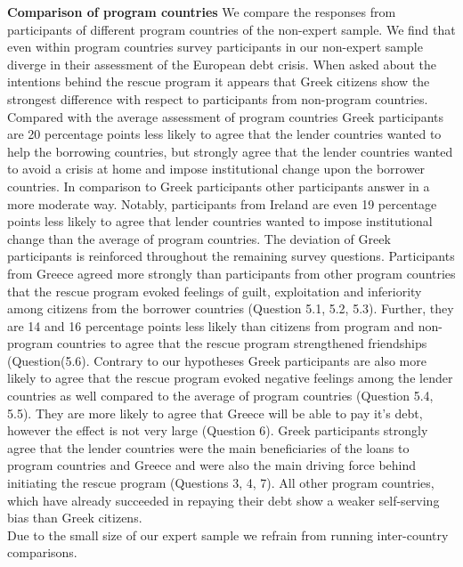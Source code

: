 \textbf{Comparison of program countries} 
We compare the responses from participants of different program countries of the non-expert sample. We find that even within program countries survey participants in our non-expert sample diverge in their assessment of the European debt crisis. When asked about the intentions behind the rescue program it appears that Greek citizens show the strongest difference with respect to participants from non-program countries. Compared with the average assessment of program countries Greek participants are 20 percentage points less likely to agree that the lender countries wanted to help the borrowing countries, but strongly agree that the lender countries wanted to avoid a crisis at home and impose institutional change upon the borrower countries. In comparison to Greek participants other participants answer in a more moderate way. Notably, participants from Ireland are even 19 percentage points less likely to agree that lender countries wanted to impose institutional change than the average of program countries. The deviation of Greek participants is reinforced throughout the remaining survey questions. Participants from Greece agreed more strongly than participants from other program countries that the rescue program evoked feelings of guilt, exploitation and inferiority among citizens from the borrower countries (Question 5.1, 5.2, 5.3). Further, they are 14 and 16 percentage points less likely than citizens from program and non-program countries to agree that the rescue program strengthened friendships (Question(5.6). Contrary to our hypotheses Greek participants are also more likely to agree that the rescue program evoked negative feelings among the lender countries as well compared to the average of program countries (Question 5.4, 5.5).  They are more likely to agree that Greece will be able to pay it's debt, however the effect is not very large (Question 6). Greek participants strongly agree that the lender countries were the main beneficiaries of the loans to program countries and Greece and were also the main driving force behind initiating the rescue program (Questions 3, 4, 7).  All other program countries, which have already succeeded in repaying their debt show a weaker self-serving bias than Greek citizens. 
\\
Due to the small size of our expert sample we refrain from running inter-country comparisons. 


